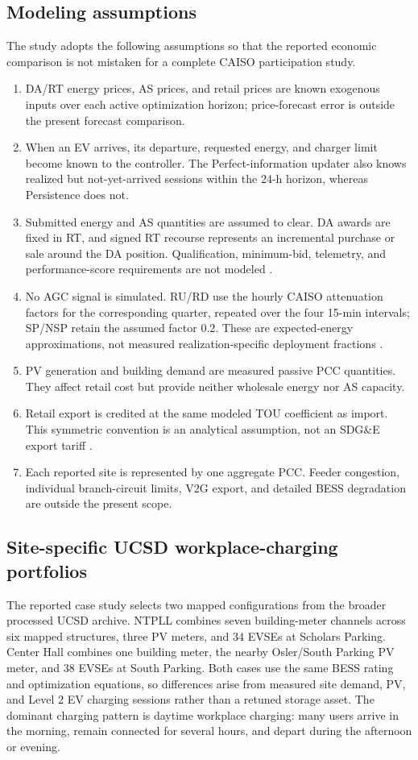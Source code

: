 \documentclass[final,5p,times]{elsarticle}
\begin{document}
\subsection{Modeling assumptions}
The study adopts the following assumptions so that the reported economic
comparison is not mistaken for a complete CAISO participation study.
\begin{enumerate}
  \item DA/RT energy prices, AS prices, and retail prices are known exogenous
  inputs over each active optimization horizon; price-forecast error is outside
  the present forecast comparison.
  \item When an EV arrives, its departure, requested energy, and charger limit
  become known to the controller. The Perfect-information updater also
  knows realized but not-yet-arrived sessions within the 24-h horizon, whereas
  Persistence does not.
  \item Submitted energy and AS quantities are assumed to clear. DA awards are
  fixed in RT, and signed RT recourse represents an incremental purchase or
  sale around the DA position. Qualification, minimum-bid, telemetry, and
  performance-score requirements are not modeled \cite{caisoAncillary2026} \cite{caisoDER2026}.
  \item No AGC signal is simulated. RU/RD use the hourly CAISO attenuation
  factors for the corresponding quarter, repeated over the four 15-min intervals;
  SP/NSP retain the assumed factor 0.2. These are expected-energy approximations,
  not measured realization-specific deployment fractions \cite{caisoAttenuation2025}.
  \item PV generation and building demand are measured passive PCC quantities.
  They affect retail cost but provide neither wholesale energy nor AS capacity.
  \item Retail export is credited at the same modeled TOU coefficient as import.
  This symmetric convention is an analytical assumption, not an SDG\&E export
  tariff \cite{sdgeLargeCommercial2025}.
  \item Each reported site is represented by one aggregate PCC. Feeder congestion,
  individual branch-circuit limits, V2G export, and detailed BESS degradation are
  outside the present scope.
\end{enumerate}

\subsection{Site-specific UCSD workplace-charging portfolios}
The reported case study selects two mapped configurations from the broader processed UCSD archive. NTPLL combines seven building-meter channels across six mapped structures, three PV meters, and 34 EVSEs at Scholars Parking. Center Hall combines one building meter, the nearby Osler/South Parking PV meter, and 38 EVSEs at South Parking. Both cases use the same BESS rating and optimization equations, so differences arise from measured site demand, PV, and Level 2 EV charging sessions rather than a retuned storage asset. The dominant charging pattern is daytime workplace charging: many users arrive in the morning, remain connected for several hours, and depart during the afternoon or evening.
\end{document}
